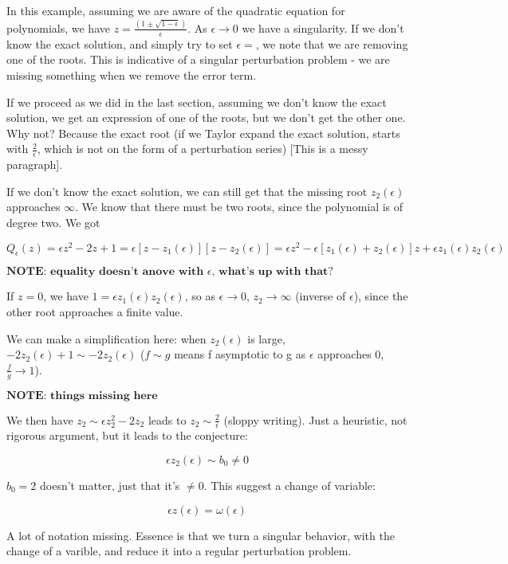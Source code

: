 \documentclass[12pt]{report}
\begin{document}
In this example, assuming we are aware of the quadratic equation for
polynomials, we have $z = \frac{(1 \pm \sqrt{1-\epsilon})}{\epsilon}$. As
$\epsilon \to 0$ we have a singularity. If we don't know the exact solution, and
simply try to set $\epsilon=$, we note that we are removing one of the roots. This is indicative of a singular perturbation problem - we are missing something when we remove the error term.

If we proceed as we did in the last section, assuming we don't know the exact
solution, we get an expression of one of the roots, but we don't get the other
one. Why not? Because the exact root (if we Taylor expand the exact solution,
starts with $\frac 2 \epsilon$, which is not on the form of a perturbation
series) [This is a messy paragraph].

If we don't know the exact solution, we can still get that the missing root
$z_2(\epsilon)$ approaches $\infty$. We know that there must be two roots, since
the polynomial is of degree two. We got

$$Q_\epsilon(z) = \epsilon z^2 - 2z +1 = \epsilon[z - z_1(\epsilon)][z -
z_2(\epsilon)] = \epsilon z^2 - \epsilon [z_1(\epsilon) + z_2(\epsilon)]z +
\epsilon z_1(\epsilon)z_2(\epsilon)$$

$\textbf{NOTE: equality doesn't anove with $\epsilon$, what's up with that?}$

If $z=0$, we have $1 = \epsilon z_1(\epsilon) z_2(\epsilon)$, so as $\epsilon
\to 0$, $z_2 \to \infty$ (inverse of $\epsilon$), since the other root approaches a finite value.

We can make a simplification here: when $z_2(\epsilon)$ is large, $-2
z_2(\epsilon) + 1 \sim -2 z_2(\epsilon)$ ($f \sim g$ means f asymptotic to g as
$\epsilon$ approaches 0, $\frac f g \to 1$).

$\textbf{NOTE: things missing here}$

We then have $z_2 \sim \epsilon z_2^2 - 2 z_2$ leads to $z_2 \sim \frac 2 \epsilon$
(sloppy writing). Just a heuristic, not rigorous argument, but it leads to the
conjecture:

$$\epsilon z_2(\epsilon) \sim b_0 \neq 0$$

$b_0 = 2$ doesn't matter, just that it's $\neq 0$. This suggest a change of
variable:

$$\epsilon z (\epsilon) = \omega (\epsilon)$$

A lot of notation missing. Essence is that we turn a singular behavior, with the
change of a varible, and reduce it into a regular perturbation problem.
\end{document}
